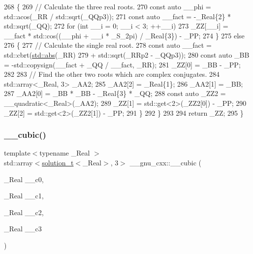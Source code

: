 \begin{DoxyCode}
268             \{
269               \textcolor{comment}{// Calculate the three real roots.}
270               \textcolor{keyword}{const} \textcolor{keyword}{auto} \_\_phi = std::acos(\_RR / std::sqrt(\_QQp3));
271               \textcolor{keyword}{const} \textcolor{keyword}{auto} \_\_fact = -\_Real\{2\} * std::sqrt(\_QQ);
272               \textcolor{keywordflow}{for} (\textcolor{keywordtype}{int} \_\_i = 0; \_\_i < 3; ++\_\_i)
273                 \_ZZ[\_\_i] = \_\_fact * std::cos((\_\_phi + \_\_i * \_S\_2pi) / \_Real\{3\}) - \_PP;
274             \}
275           \textcolor{keywordflow}{else}
276             \{
277               \textcolor{comment}{// Calculate the single real root.}
278               \textcolor{keyword}{const} \textcolor{keyword}{auto} \_\_fact = std::cbrt(\hyperlink{namespace____gnu__cxx_ab9eb9db3560f504f8cd25a71bcb6ead5}{std::abs}(\_RR)
279                                           + std::sqrt(\_RRp2 - \_QQp3));
280               \textcolor{keyword}{const} \textcolor{keyword}{auto} \_BB = -std::copysign(\_\_fact + \_QQ / \_\_fact, \_RR);
281               \_ZZ[0] = \_BB - \_PP;
282 
283               \textcolor{comment}{// Find the other two roots which are complex conjugates.}
284               std::array<\_Real, 3> \_AA2;
285               \_AA2[2] = \_Real\{1\};
286               \_AA2[1] = \_BB;
287               \_AA2[0] = \_BB * \_BB - \_Real\{3\} * \_QQ;
288               \textcolor{keyword}{const} \textcolor{keyword}{auto} \_ZZ2 = \_\_quadratic<\_Real>(\_AA2);
289               \_ZZ[1] = std::get<2>(\_ZZ2[0]) - \_PP;
290               \_ZZ[2] = std::get<2>(\_ZZ2[1]) - \_PP;
291             \}
292         \}
293 
294       \textcolor{keywordflow}{return} \_ZZ;
295     \}
\end{DoxyCode}
\mbox{\label{namespace____gnu__cxx_ad1ce809c9dd84dd6cd0229fb73f7dbec}} 
\subsubsection{\texorpdfstring{\+\_\+\+\_\+cubic()}{\_\_cubic()}\hspace{0.1cm}{\footnotesize\ttfamily [2/2]}}
{\footnotesize\ttfamily template$<$typename \+\_\+\+Real $>$ \\
std\+::array$<$\hyperlink{namespace____gnu__cxx_ae20ea642de50eb361074c62676b0159c}{solution\+\_\+t}$<$\+\_\+\+Real$>$, 3$>$ \+\_\+\+\_\+gnu\+\_\+cxx\+::\+\_\+\+\_\+cubic (\begin{DoxyParamCaption}\item[{\+\_\+\+Real}]{\+\_\+\+\_\+c0,  }\item[{\+\_\+\+Real}]{\+\_\+\+\_\+c1,  }\item[{\+\_\+\+Real}]{\+\_\+\+\_\+c2,  }\item[{\+\_\+\+Real}]{\+\_\+\+\_\+c3 }\end{DoxyParamCaption})\hspace{0.3cm}{\ttfamily [inline]}}



